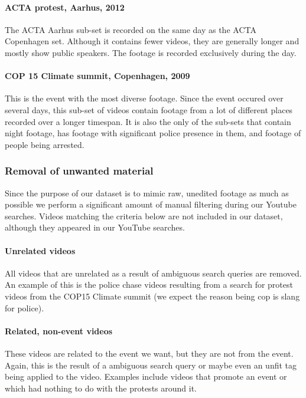 \paragraph{ACTA protest, Aarhus, 2012}
%
The ACTA Aarhus sub-set is recorded on the same day as the ACTA Copenhagen set. Although it contains fewer videos, they are generally longer and mostly show public speakers. The footage is recorded exclusively during the day.
%
\paragraph{COP 15 Climate summit, Copenhagen, 2009}
%
This is the event with the most diverse footage. Since the event occured over several days, this sub-set of videos contain footage from a lot of different places recorded over a longer timespan. It is also the only of the sub-sets that contain night footage, has footage with significant police presence in them, and footage of people being arrested.
%
\subsubsection{Removal of unwanted material}
%
Since the purpose of our dataset is to mimic raw, unedited footage as much as possible we perform a significant amount of manual filtering during our Youtube searches. Videos matching the criteria below are not included in our dataset, although they appeared in our YouTube searches.
%
\paragraph{Unrelated videos}
%
All videos that are unrelated as a result of ambiguous search queries are removed. An example of this is the police chase videos resulting from a search for protest videos from the COP15 Climate summit (we expect the reason being cop is slang for police).
%
\paragraph{Related, non-event videos}
%
These videos are related to the event we want, but they are not from the event. Again, this is the result of a ambiguous search query or maybe even an unfit tag being applied to the video. Examples include videos that promote an event or which had nothing to do with the protests around it.
%
